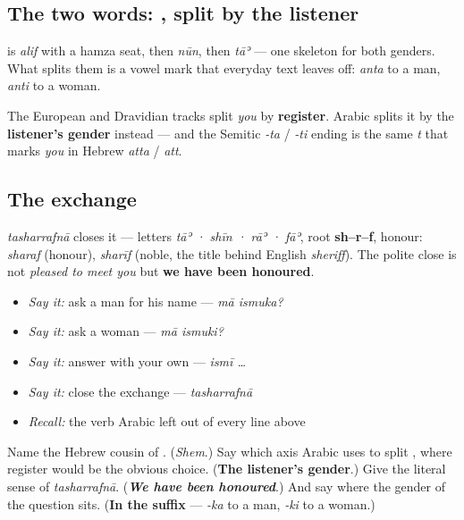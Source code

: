 \subsection*{The two words: , split by the listener}
\textbf{} is \emph{alif} with a hamza seat, then \emph{nūn}, then \emph{tāʾ} — one skeleton for both genders. What splits them is a vowel mark that everyday text leaves off: \textbf{} \emph{anta} to a man, \textbf{} \emph{anti} to a woman.

The European and Dravidian tracks split \emph{you} by \textbf{register}. Arabic splits it by the \textbf{listener's gender} instead — and the Semitic \emph{-ta} / \emph{-ti} ending is the same \emph{t} that marks \emph{you} in Hebrew \emph{atta} / \emph{att}.

\subsection*{The exchange}
\emph{tasharrafnā} closes it — letters \emph{tāʾ · shīn · rāʾ · fāʾ}, root \textbf{sh–r–f}, honour: \emph{sharaf} (honour), \emph{sharīf} (noble, the title behind English \emph{sheriff}). The polite close is not \emph{pleased to meet you} but \textbf{we have been honoured}.

\begin{itemize}
\raggedright
  \item \emph{Say it:} ask a man for his name — \emph{mā ismuka?}
  \item \emph{Say it:} ask a woman — \emph{mā ismuki?}
  \item \emph{Say it:} answer with your own — \emph{ismī …}
  \item \emph{Say it:} close the exchange — \emph{tasharrafnā}
  \item \emph{Recall:} the verb Arabic left out of every line above
\end{itemize}

\begin{tcolorbox}[breakable,colback=teal!4,colframe=teal!35!black,title={Before you move on}]
Name the Hebrew cousin of \textbf{}. (\emph{Shem}.) Say which axis Arabic uses to split \textbf{}, where register would be the obvious choice. (\textbf{The listener's gender}.) Give the literal sense of \emph{tasharrafnā}. (\emph{\textbf{We have been honoured}}.) And say where the gender of the question sits. (\textbf{In the suffix} — \emph{-ka} to a man, \emph{-ki} to a woman.)
\end{tcolorbox}

